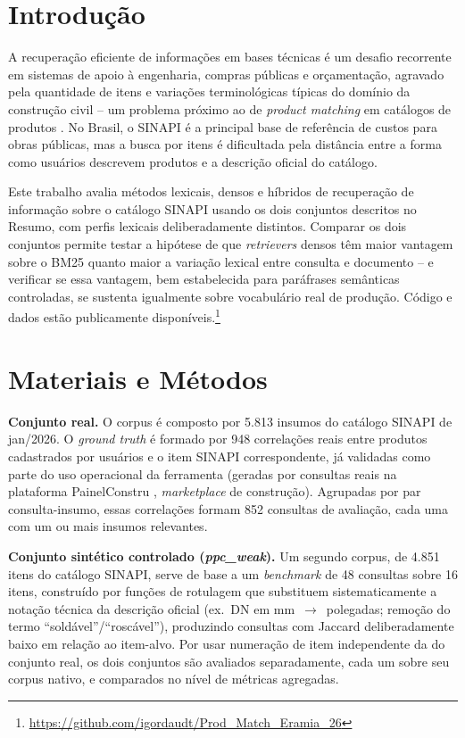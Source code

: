 \documentclass[12pt]{article}
\begin{document}
\section{Introdu\c{c}\~ao}

A recupera\c{c}\~ao eficiente de informa\c{c}\~oes em bases t\'ecnicas \'e um desafio recorrente em sistemas de apoio \`a engenharia, compras p\'ublicas e or\c{c}amenta\c{c}\~ao, agravado pela quantidade de itens e varia\c{c}\~oes terminol\'ogicas t\'ipicas do dom\'inio da constru\c{c}\~ao civil -- um problema pr\'oximo ao de \emph{product matching} em cat\'alogos de produtos \cite{peeters:20}. No Brasil, o SINAPI \'e a principal base de refer\^encia de custos para obras p\'ublicas, mas a busca por itens \'e dificultada pela dist\^ancia entre a forma como usu\'arios descrevem produtos e a descri\c{c}\~ao oficial do cat\'alogo.

Este trabalho avalia m\'etodos lexicais, densos e h\'ibridos de recupera\c{c}\~ao de informa\c{c}\~ao sobre o cat\'alogo SINAPI usando os dois conjuntos descritos no Resumo, com perfis lexicais deliberadamente distintos. Comparar os dois conjuntos permite testar a hip\'otese de que \emph{retrievers} densos t\^em maior vantagem sobre o BM25 quanto maior a varia\c{c}\~ao lexical entre consulta e documento -- e verificar se essa vantagem, bem estabelecida para par\'afrases sem\^anticas controladas, se sustenta igualmente sobre vocabul\'ario real de produ\c{c}\~ao. C\'odigo e dados est\~ao publicamente dispon\'iveis.\footnote{\url{https://github.com/igordaudt/Prod_Match_Eramia_26}}

\section{Materiais e M\'etodos}

\textbf{Conjunto real.} O corpus \'e composto por 5.813 insumos do cat\'alogo SINAPI de jan/2026. O \emph{ground truth} \'e formado por 948 correla\c{c}\~oes reais entre produtos cadastrados por usu\'arios e o item SINAPI correspondente, j\'a validadas como parte do uso operacional da ferramenta (geradas por consultas reais na plataforma PainelConstru \cite{painelconstru:26}, \emph{marketplace} de constru\c{c}\~ao). Agrupadas por par consulta-insumo, essas correla\c{c}\~oes formam 852 consultas de avalia\c{c}\~ao, cada uma com um ou mais insumos relevantes.

\textbf{Conjunto sint\'etico controlado (\emph{ppc\_weak}).} Um segundo corpus, de 4.851 itens do cat\'alogo SINAPI, serve de base a um \emph{benchmark} de 48 consultas sobre 16 itens, constru\'ido por fun\c{c}\~oes de rotulagem que substituem sistematicamente a nota\c{c}\~ao t\'ecnica da descri\c{c}\~ao oficial (ex.\ DN em mm~$\rightarrow$~polegadas; remo\c{c}\~ao do termo ``sold\'avel''/``rosc\'avel''), produzindo consultas com Jaccard deliberadamente baixo em rela\c{c}\~ao ao item-alvo. Por usar numera\c{c}\~ao de item independente da do conjunto real, os dois conjuntos s\~ao avaliados separadamente, cada um sobre seu corpus nativo, e comparados no n\'ivel de m\'etricas agregadas.
\end{document}
